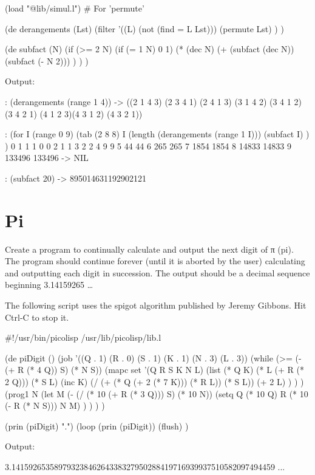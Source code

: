 \begin{wideverbatim}

(load "@lib/simul.l")  # For 'permute'

(de derangements (Lst)
   (filter
      '((L) (not (find = L Lst)))
      (permute Lst) ) )

(de subfact (N)
   (if (>= 2 N)
      (if (= 1 N) 0 1)
      (*
         (dec N)
         (+ (subfact (dec N)) (subfact (- N 2))) ) ) )

Output:

: (derangements (range 1 4))
-> ((2 1 4 3) (2 3 4 1) (2 4 1 3) (3 1 4 2) (3 4 1 2) (3 4 2 1) 
(4 1 2 3)(4 3 1 2) (4 3 2 1))

: (for I (range 0 9)
   (tab (2 8 8)
      I
      (length (derangements (range 1 I)))
      (subfact I) ) )
 0       1       1
 1       0       0
 2       1       1
 3       2       2
 4       9       9
 5      44      44
 6     265     265
 7    1854    1854
 8   14833   14833
 9  133496  133496
-> NIL

: (subfact 20)
-> 895014631192902121

\end{wideverbatim}

\pagebreak{}
\section*{Pi}

Create a program to continually calculate and output the next digit of π
(pi). The program should continue forever (until it is aborted by the
user) calculating and outputting each digit in succession. The output
should be a decimal sequence beginning 3.14159265 \ldots{}

\begin{wideverbatim}

The following script uses the spigot algorithm published by Jeremy Gibbons.
Hit Ctrl-C to stop it.

#!/usr/bin/picolisp /usr/lib/picolisp/lib.l

(de piDigit ()
   (job '((Q . 1) (R . 0) (S . 1) (K . 1) (N . 3) (L . 3))
      (while (>= (- (+ R (* 4 Q)) S) (* N S))
         (mapc set '(Q R S K N L)
            (list
               (* Q K)
               (* L (+ R (* 2 Q)))
               (* S L)
               (inc K)
               (/ (+ (* Q (+ 2 (* 7 K))) (* R L)) (* S L))
               (+ 2 L) ) ) )
      (prog1 N
         (let M (- (/ (* 10 (+ R (* 3 Q))) S) (* 10 N))
            (setq Q (* 10 Q)  R (* 10 (- R (* N S)))  N M) ) ) ) )

(prin (piDigit) ".")
(loop
   (prin (piDigit))
   (flush) )

Output:

3.14159265358979323846264338327950288419716939937510582097494459 ...

\end{wideverbatim}

